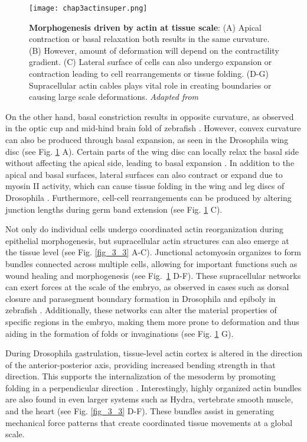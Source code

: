 \begin{figure}
	\centering
	\texttt{[image: chap3actinsuper.png]}
	\caption{\label{fig_3_4} \textbf{Morphogenesis driven by actin at tissue scale}: (A) Apical contraction or basal relaxation both results in the same curvature. (B) However, amount of deformation will depend on the contractility gradient. (C) Lateral surface of cells can also undergo expansion or contraction leading to cell rearrangements or tissue folding. (D-G) Supracellular actin cables plays vital role in creating boundaries or causing large scale deformations. \textit{Adapted from \cite{clarke2021}}
	}
\end{figure}

On the other hand, basal constriction results in opposite curvature, as observed in the optic cup and mid-hind brain fold of zebrafish \cite{sidhaye2017, gutzman2018}. However, convex curvature can also be produced through basal expansion, as seen in the Drosophila wing disc (see Fig. \ref{fig_3_4} A). Certain parts of the wing disc can locally relax the basal side without affecting the apical side, leading to basal expansion \cite{sui2018}. In addition to the apical and basal surfaces, lateral surfaces can also contract or expand due to myosin II activity, which can cause tissue folding in the wing and leg discs of Drosophila \cite{sui2018, monier2015}. Furthermore, cell-cell rearrangements can be produced by altering junction lengths during germ band extension \cite{yu2016, collinet2015} (see Fig. \ref{fig_3_4} C). 

Not only do individual cells undergo coordinated actin reorganization during epithelial morphogenesis, but supracellular actin structures can also emerge at the tissue level (see Fig. \ref{fig_3_3} A-C). Junctional actomyosin organizes to form bundles connected across multiple cells, allowing for important functions such as wound healing and morphogenesis \cite{brugues2014, clarke2021} (see Fig.~\ref{fig_3_4} D-F). These supracellular networks can exert forces at the scale of the embryo, as observed in cases such as dorsal closure and parasegment boundary formation in Drosophila and epiboly in zebrafish \cite{ducuing2016, calzolari2014}. Additionally, these networks can alter the material properties of specific regions in the embryo, making them more prone to deformation and thus aiding in the formation of folds or invaginations (see Fig. \ref{fig_3_4} G). 

During Drosophila gastrulation, tissue-level actin cortex is altered in the direction of the anterior-posterior axis, providing increased bending strength in that direction. This supports the internalization of the mesoderm by promoting folding in a perpendicular direction \cite{yevick2019}. Interestingly, highly organized actin bundles are also found in even larger systems such as Hydra, vertebrate smooth muscle, and the heart \cite{maroudas-sacks2021, palmer2021, cetera2014, helm2005} (see Fig. \ref{fig_3_3} D-F). These bundles assist in generating mechanical force patterns that create coordinated tissue movements at a global scale.

